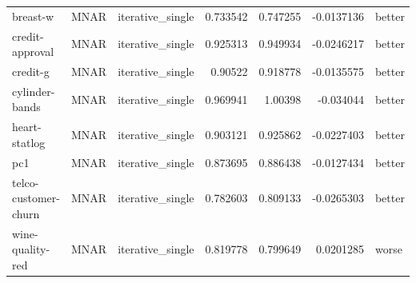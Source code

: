 \begin{table}[ht]
\begin{tabular}{lllrrrl}
 breast-w             & MNAR        & iterative\_single &                                 0.733542 &                             0.747255 &                    -0.0137136  & better               \\
 credit-approval      & MNAR        & iterative\_single &                                 0.925313 &                             0.949934 &                    -0.0246217  & better               \\
 credit-g             & MNAR        & iterative\_single &                                 0.90522  &                             0.918778 &                    -0.0135575  & better               \\
 cylinder-bands       & MNAR        & iterative\_single &                                 0.969941 &                             1.00398  &                    -0.034044   & better               \\
 heart-statlog        & MNAR        & iterative\_single &                                 0.903121 &                             0.925862 &                    -0.0227403  & better               \\
 pc1                  & MNAR        & iterative\_single &                                 0.873695 &                             0.886438 &                    -0.0127434  & better               \\
 telco-customer-churn & MNAR        & iterative\_single &                                 0.782603 &                             0.809133 &                    -0.0265303  & better               \\
 wine-quality-red     & MNAR        & iterative\_single &                                 0.819778 &                             0.799649 &                     0.0201285  & worse                \\
\hline
\end{tabular}
\end{table}
